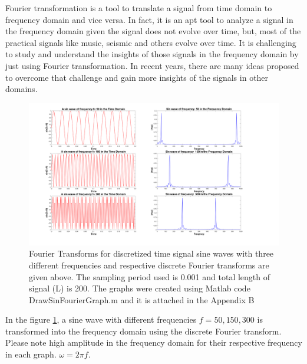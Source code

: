 Fourier transformation is a tool to translate a signal from time domain to frequency domain and vice versa. In fact, it is an apt tool to analyze a signal in the frequency domain given the signal does not evolve over time, but, most of the practical signals like music, seismic and others evolve over time. It is challenging to study and understand the insights of those signals in the frequency domain by just using Fourier transformation. In recent years, there are many ideas proposed to overcome that challenge and gain more insights of the signals in other domains. 

\begin{figure}[!ht]
\includegraphics[scale=.15]{Images/fourier-sin}
\caption{Fourier Transforms for discretized time signal sine waves with three different frequencies and respective discrete Fourier transforms are given above. The sampling period used is 0.001 and total length of signal (L) is 200. The graphs were created using Matlab code DrawSinFourierGraph.m and it is attached in the Appendix B}
\label{fig:Fourier-sin}
\end{figure}

In the figure \ref{fig:Fourier-sin}, a sine wave with different frequencies ${f = 50,150,300}$ is transformed into the frequency domain using the discrete Fourier transform. Please note high amplitude in the frequency domain for their respective frequency in each graph. $\omega = 2\pi f$.

